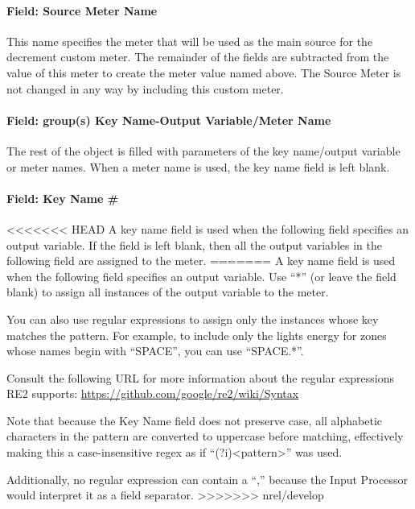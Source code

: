 \paragraph{Field: Source Meter Name}\label{field-source-meter-name}

This name specifies the meter that will be used as the main source for the decrement custom meter. The remainder of the fields are subtracted from the value of this meter to create the meter value named above. The Source Meter is not changed in any way by including this custom meter.

\paragraph{Field: group(s) Key Name-Output Variable/Meter Name}\label{field-groups-key-name-output-variablemeter-name-1}

The rest of the object is filled with parameters of the key name/output variable or meter names. When a meter name is used, the key name field is left blank.

\paragraph{Field: Key Name \#}\label{field-key-name-1}

<<<<<<< HEAD
A key name field is used when the following field specifies an output variable. If the field is left blank, then all the output variables in the following field are assigned to the meter.
=======
A key name field is used when the following field specifies an output variable.
Use ``*'' (or leave the field blank) to assign all instances of the output variable to the meter.

You can also use regular expressions to assign only the instances whose key matches the pattern.
For example, to include only the lights energy for zones whose names begin with ``SPACE'', you can use ``SPACE.*''.

Consult the following URL for more information about the regular expressions RE2 supports: \url{https://github.com/google/re2/wiki/Syntax}

Note that because the Key Name field does not preserve case, all alphabetic characters in the pattern are converted to uppercase before matching, effectively making this a case-insensitive regex as if ``(?i)<pattern>'' was used.

Additionally, no regular expression can contain a ``,'' because the Input Processor would interpret it as a field separator.
>>>>>>> nrel/develop

